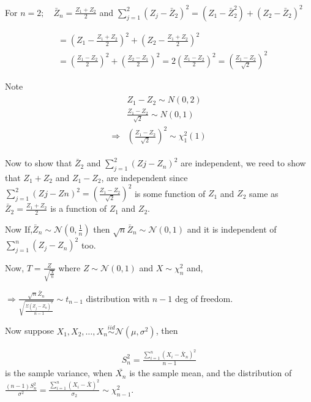 \documentclass[10pt,leqno]{report}
\begin{document}
For \(n=2 ; \quad \bar{Z}_n=\frac{Z_1+Z_2}{2}\) and \(\sum_{j=1}^2\left(Z_j-\bar{Z}_2\right)^2=\left(Z_1-\bar{Z}_2^2\right)+\left(Z_2-\bar{Z}_2\right)^2\)

\begin{align*}
    & = \left(Z_1-\frac{Z_1+Z_2}{2}\right)^2+\left(Z_2-\frac{Z_1+Z_2}{2}\right)^2\\
    & = \left(\frac{Z_1-Z_2}{2}\right)^2+\left(\frac{Z_2-Z_1}{2}\right)^2=2\left(\frac{Z_1-Z_2}{2}\right)^2=\left(\frac{Z_1-Z_2}{\sqrt{2}}\right)^2
\end{align*}

Note
\begin{align*}
\begin{aligned}
& Z_1-Z_2 \sim N(0,2)\\
& \frac{Z_1-Z_2}{\sqrt{2}} \sim N(0,1) \\
\Rightarrow & \left(\frac{Z_1-Z_2}{\sqrt{2}}\right)^2 \sim \chi_1^2(1)
\end{aligned}
\end{align*}


Now to show that \(\bar{Z}_2\) and \(\sum_{j=1}^2\left(Zj-Z_n\right)^2\) are independent, we reed to show that \(Z_1+Z_2\) and \(Z_1-Z_2\), are independent since \(\sum_{j=1}^{2}(Zj-Zn)^2=\left(\frac{Z_1-Z_2}{\sqrt{2}}\right)^2\) is some function of \(Z_1\) and \(Z_2\) same as \(\bar{Z}_2=\frac{Z_1+Z_2}{2}\) is a function of \(Z_1\) and \(Z_2\).

Now If,\(\bar{Z}_n\sim \mathcal{N}\left(0,\frac{1}{n}\right)\) 
then \(\sqrt{n} \bar{Z}_n \sim \mathcal{N}(0,1)\) 
and it is independent of \(\sum_{j=1}^n\left(Z_j - Z_n\right)^2\) too.

Now, \(T=\frac{Z}{\sqrt{\frac{X}{n}}}\) where \(Z \sim \mathcal{N}(0,1)\) 
and \(X\sim \chi^2_{n}\) and,

\(\Rightarrow \frac{\sqrt{n} \bar{Z}_n}{\sqrt{\frac{\Sigma\left(Z_j-Z_n\right)^2}{n-1}}} \sim t_{n-1}\) distribution with \(n-1\) deg of freedom.


Now suppose \(X_1, X_2, \ldots, X_n \overset{iid}{\sim}  \mathcal{N}\left(\mu, \sigma^2\right)\), then

\begin{align*}
    S_n^2=\frac{\sum_{i=1}^n\left(X_i-\bar{X}_n\right)^2}{n-1}
    \end{align*}
is the sample variance, when \(\bar{X_{n}}\) is the sample mean,
and the distribution of \(\frac{(n-1) S_n^2}{\sigma^2}=\frac{\sum_{i=1}^n\left(X_i-\bar{X}\right)^2}{\sigma_2} \sim \chi_{n-1}^2\).
\end{document}
